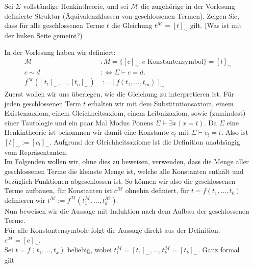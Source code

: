 
\begin{exercise}[118]

Sei $\Sigma$ vollständige Henkintheorie, und sei $\mathscr{M}$ die zugehörige
in der Vorlesung definierte Struktur (Äquivalenzklassen von geschlossenen Termen).
Zeigen Sie, dass für alle geschlossenen Terme $t$ die Gleichung $t^{\mathscr{M}} = [t]_{\sim}$
gilt. (Was ist mit der linken Seite gemeint?)

\end{exercise}


\begin{solution}
In der Vorlesung haben wir definiert:
\begin{align*}
  \mathscr{M}&: M = \{[c]_{\sim}: c \text{ Konstantensymbol} \} = {[t]_\sim }\\
  c \sim d &:\iff \Sigma \vdash c = d. \\
  f^\mathscr{M}([t_1]_\sim, \dots, [t_n]_\sim) &:= [f(t_1, \dots, t_m)]_\sim
\end{align*}
Zuerst wollen wir uns überlegen, wie die Gleichung zu interpretieren ist. Für jeden geschlossenen Term $t$ erhalten wir mit dem Substitutionsaxiom, einem Existenzaxiom, einem Gleichheitsaxiom, einem Leibnizaxiom, sowie (zumindest) einer Tautologie und ein paar Mal Modus Ponens $\Sigma \vdash \exists x(x = t)$. Da $\Sigma$ eine Henkintheorie ist bekommen wir damit eine Konstante $c_t$ mit $\Sigma \vdash c_t = t$. Also ist $[t]_\sim := [c_t]_\sim$. Aufgrund der Gleichheitsaxiome ist die Definition unabhängig vom Repräsentanten. \\
Im Folgenden wollen wir, ohne dies zu beweisen, verwenden, dass die Menge aller geschlossenen Terme die kleinste Menge ist, welche alle Konstanten enthält und bezüglich Funktionen abgeschlossen ist. So können wir also die geschlossenen Terme aufbauen, für Konstanten ist $c^\mathscr{M}$ ohnehin definiert, für $t = f(t_1, \dots, t_k)$ definieren wir $t^\mathscr{M} := f^\mathscr{M}(t_1^\mathscr{M}, \dots, t_k^\mathscr{M})$.  \\
Nun beweisen wir die Aussage mit Induktion nach dem Aufbau der geschlossenen Terme. \\
Für alle Konstantensymbole folgt die Aussage direkt aus der Definition: $c^{\mathscr{M}} = [c]_{\sim}$. \\
Sei $t = f(t_1,\dots,t_k)$ beliebig, wobei $t_1^\mathscr{M} = [t_1]_\sim, \dots, t_k^\mathscr{M} = [t_k]_\sim$. Ganz formal gilt

\end{solution}
